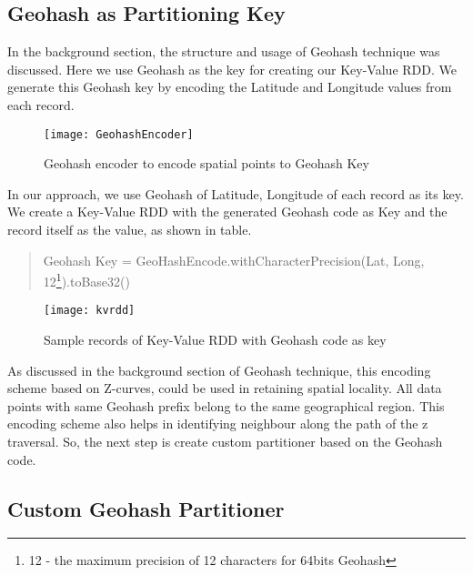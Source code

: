 \documentclass[article,type=msc,colorback,12pt,accentcolor=tud1d]{tudthesis}
\begin{document}
		\subsection{Geohash as Partitioning Key}
			\par In the background section, the structure and usage of Geohash technique was discussed. Here we use Geohash as the key for creating our Key-Value RDD. We generate this Geohash key by encoding the Latitude and Longitude values from each record. \\
						
				\begin{figure}[h]
					\centering
					\texttt{[image: GeohashEncoder]}
					\caption{Geohash encoder to encode spatial points to Geohash Key}
					\label{fig:GeohashEncoder}
				\end{figure}
		In our approach, we use Geohash of Latitude, Longitude of each record as its key. We create a Key-Value RDD with the generated Geohash code as Key and the record itself as the value, as shown in table. 
		\begin{quote}
			Geohash Key = GeoHashEncode.withCharacterPrecision(Lat, Long, 12\footnote{12 - the  maximum precision of 12 characters for 64bits Geohash}).toBase32()
		\end{quote}
				\begin{figure}[h]
					\centering
					\texttt{[image: kvrdd]}
					\caption{Sample records of Key-Value RDD with Geohash code as key}
					\label{fig:kvrdd}
				\end{figure}
				
				As discussed in the background section of Geohash technique, this encoding scheme based on Z-curves, could be used in retaining spatial locality. All data points with same Geohash prefix belong to the same geographical region. This encoding scheme also helps in identifying neighbour along the path of the z traversal. So, the next step is create custom partitioner based on the Geohash code.

		
		\subsection{Custom Geohash Partitioner}
		
\end{document}
